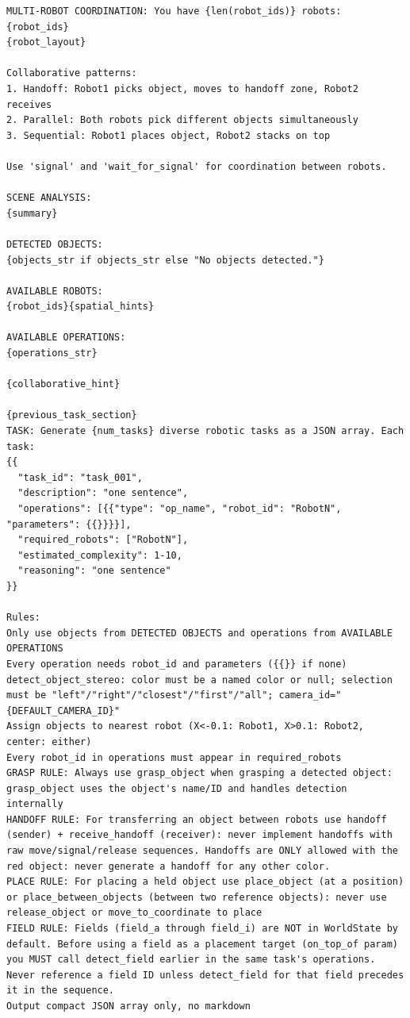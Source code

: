 \begin{lstlisting}[caption={AutoRT task generation prompt integrating VLM scene analysis, operational schemas, and multi-robot collaborative patterns.}, extendedchars=true]
MULTI-ROBOT COORDINATION: You have {len(robot_ids)} robots: {robot_ids}
{robot_layout}

Collaborative patterns:
1. Handoff: Robot1 picks object, moves to handoff zone, Robot2 receives
2. Parallel: Both robots pick different objects simultaneously
3. Sequential: Robot1 places object, Robot2 stacks on top

Use 'signal' and 'wait_for_signal' for coordination between robots.

SCENE ANALYSIS:
{summary}

DETECTED OBJECTS:
{objects_str if objects_str else "No objects detected."}

AVAILABLE ROBOTS:
{robot_ids}{spatial_hints}

AVAILABLE OPERATIONS:
{operations_str}

{collaborative_hint}

{previous_task_section}
TASK: Generate {num_tasks} diverse robotic tasks as a JSON array. Each task:
{{
  "task_id": "task_001",
  "description": "one sentence",
  "operations": [{{"type": "op_name", "robot_id": "RobotN", "parameters": {{}}}}],
  "required_robots": ["RobotN"],
  "estimated_complexity": 1-10,
  "reasoning": "one sentence"
}}

Rules:
Only use objects from DETECTED OBJECTS and operations from AVAILABLE OPERATIONS
Every operation needs robot_id and parameters ({{}} if none)
detect_object_stereo: color must be a named color or null; selection must be "left"/"right"/"closest"/"first"/"all"; camera_id="{DEFAULT_CAMERA_ID}"
Assign objects to nearest robot (X<-0.1: Robot1, X>0.1: Robot2, center: either)
Every robot_id in operations must appear in required_robots
GRASP RULE: Always use grasp_object when grasping a detected object: grasp_object uses the object's name/ID and handles detection internally
HANDOFF RULE: For transferring an object between robots use handoff (sender) + receive_handoff (receiver): never implement handoffs with raw move/signal/release sequences. Handoffs are ONLY allowed with the red object: never generate a handoff for any other color.
PLACE RULE: For placing a held object use place_object (at a position) or place_between_objects (between two reference objects): never use release_object or move_to_coordinate to place
FIELD RULE: Fields (field_a through field_i) are NOT in WorldState by default. Before using a field as a placement target (on_top_of param) you MUST call detect_field earlier in the same task's operations. Never reference a field ID unless detect_field for that field precedes it in the sequence.
Output compact JSON array only, no markdown
\end{lstlisting}

